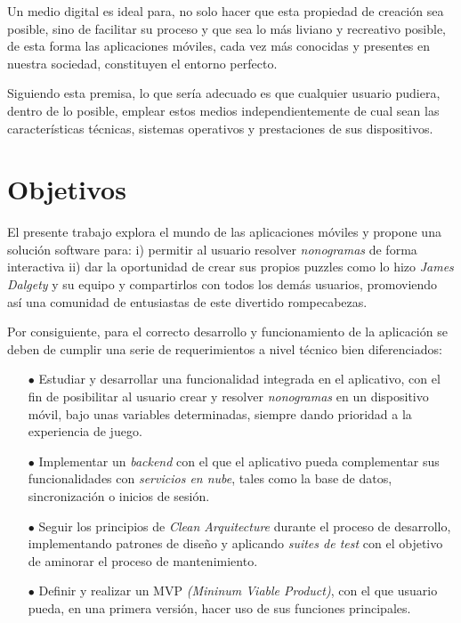 Un medio digital es ideal para, no solo hacer que esta propiedad de creación sea posible, sino de facilitar su proceso 
y que sea lo más liviano y recreativo posible, de esta forma las aplicaciones móviles, cada vez más conocidas y presentes en nuestra sociedad, constituyen el entorno
perfecto.

Siguiendo esta premisa, lo que sería adecuado es que cualquier usuario pudiera, dentro de lo posible, emplear estos medios
independientemente de cual sean las características técnicas, sistemas operativos y prestaciones de sus dispositivos.

\section{Objetivos}

El presente trabajo explora el mundo de las aplicaciones móviles y propone
una solución software para: i) permitir al usuario resolver \textit{nonogramas} de forma
interactiva ii) dar la oportunidad de crear sus propios puzzles como lo hizo
\textit{James Dalgety} y su equipo y compartirlos con todos los demás usuarios,
promoviendo así una comunidad de entusiastas de este divertido rompecabezas.

Por consiguiente, para el correcto desarrollo y funcionamiento de la aplicación se deben de
cumplir una serie de requerimientos a nivel técnico bien diferenciados:
\begin{itemize}
   \item[$\bullet$] Estudiar y desarrollar una funcionalidad integrada en el aplicativo, con el fin de posibilitar al usuario
   crear y resolver \textit{nonogramas} en un dispositivo móvil, bajo unas variables determinadas, siempre dando prioridad a la experiencia de juego.
   \item[$\bullet$] Implementar un \textit{backend} con el que el aplicativo pueda complementar sus funcionalidades con \textit{servicios en nube},
   tales como la base de datos, sincronización o inicios de sesión.
   \item[$\bullet$] Seguir los principios de \textit{Clean Arquitecture} durante el proceso de desarrollo, implementando patrones de diseño y
   aplicando \textit{suites de test} con el objetivo de aminorar el proceso de mantenimiento.
   \item[$\bullet$] Definir y realizar un MVP \textit{(Mininum Viable Product)}, con el que usuario pueda, en una primera versión,
   hacer uso de sus funciones principales.
\end{itemize}

